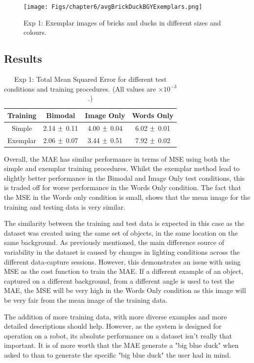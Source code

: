 \begin{figure}[ht]
    \centering
    \texttt{[image: Figs/chapter6/avgBrickDuckBGYExemplars.png]}
    \caption{Exp 1: Exemplar images of bricks and ducks in different sizes and colours.}
    \label{fig:ExmBrickDuck}
\end{figure}

\subsection{Results}

\begin{table}[h!]
\centering
	\begin{tabular}{|c|c|c|c|}
	\hline
\textbf{Training} & 	\textbf{Bimodal} & 	\textbf{Image Only} 	& 	\textbf{Words Only} \\ \hline
Simple & 2.14 $\mypm$ 0.11 & 4.00	$\mypm$ 0.04 & 6.02 $\mypm$ 	0.01 \\ \hline
Exemplar & 2.06 $\mypm$ 0.07 & 3.44 $\mypm$ 0.51 & 7.92	$\mypm$ 0.02 \\ \hline
\end{tabular}
\caption{Exp 1: Total Mean Squared Error for different test conditions and training procedures. (All values are $\times10^{-3}$.)}
\label{tab:6_res_exp1}
\end{table}

Overall, the MAE has similar performance in terms of MSE using both the simple and exemplar training procedures. Whilst the exemplar method lead to slightly better performance in the Bimodal and Image Only test conditions, this is traded off for worse performance in the Words Only condition. The fact that the MSE in the Words only condition is small, shows that the mean image for the training and testing data is very similar.

The similarity between the training and test data is expected in this case as the dataset was created using the same set of objects, in the same location on the same background. As previously mentioned, the main difference source of variability in the dataset is caused by changes in lighting conditions across the different data-capture sessions. However, this demonstrates an issue with using MSE as the cost function to train the MAE. If a different example of an object, captured on a different background, from a different angle is used to test the MAE, the MSE will be very high in the Words Only condition as this image will be very fair from the mean image of the training data.

The addition of more training data, with more diverse examples and more detailed descriptions should help. However, as the system is designed for operation on a robot, its absolute performance on a dataset isn't really that important. It is of more worth that the MAE generate a "big blue duck" when asked to than to generate the specific "big blue duck" the user had in mind.

